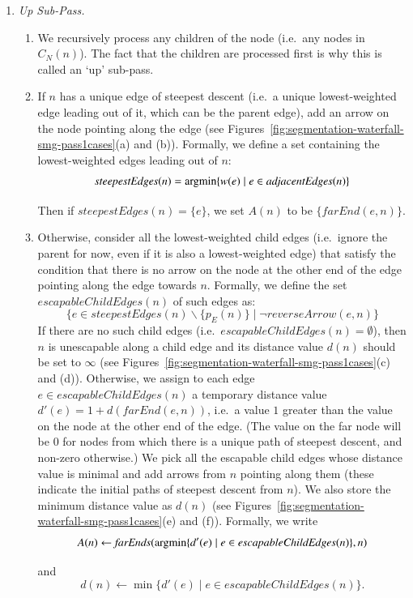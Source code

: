 \documentclass[preprint,a4paper]{elsarticle}
\newcommand{\argmin}{\operatornamewithlimits{argmin}}
\newcommand{\funcname}[1]{\mathit{#1}}
\begin{document}

\begin{enumerate}

\item \emph{Up Sub-Pass.}

\begin{enumerate}
\item We recursively process any children of the node (i.e.~any nodes in $C_N(n)$). The fact that the children are processed first is why this is called an `up' sub-pass.

\item If $n$ has a unique edge of steepest descent (i.e.~a unique lowest-weighted edge leading out of it, which can be the parent edge), add an arrow on the node pointing along the edge (see Figures~\ref{fig:segmentation-waterfall-smg-pass1cases}(a) and (b)). Formally, we define a set containing the lowest-weighted edges leading out of $n$:
%
\[
\funcname{steepestEdges}(n) = \argmin_{}\{w(e) \; | \; e \in \funcname{adjacentEdges}(n)\}
\]
%
Then if $\funcname{steepestEdges}(n) = \{e\}$, we set $A(n)$ to be $\{\funcname{farEnd}(e,n)\}$.

\item Otherwise, consider all the lowest-weighted child edges (i.e.~ignore the parent for now, even if it is also a lowest-weighted edge) that satisfy the condition that there is no arrow on the node at the other end of the edge pointing along the edge towards $n$. Formally, we define the set $\funcname{escapableChildEdges}(n)$ of such edges as:
%
\[
\{e \in \funcname{steepestEdges}(n) \backslash \{p_E(n)\} \; | \; \neg \funcname{reverseArrow}(e,n)\}
\]
%
If there are no such child edges (i.e.~$\funcname{escapableChildEdges}(n) = \emptyset$), then $n$ is unescapable along a child edge and its distance value $d(n)$ should be set to $\infty$ (see Figures~\ref{fig:segmentation-waterfall-smg-pass1cases}(c) and (d)). Otherwise, we assign to each edge $e \in \funcname{escapableChildEdges}(n)$ a temporary distance value $d'(e) = 1 + d(\funcname{farEnd}(e,n))$, i.e.~a value $1$ greater than the value on the node at the other end of the edge. (The value on the far node will be $0$ for nodes from which there is a unique path of steepest descent, and non-zero otherwise.) We pick all the escapable child edges whose distance value is minimal and add arrows from $n$ pointing along them (these indicate the initial paths of steepest descent from $n$). We also store the minimum distance value as $d(n)$ (see Figures~\ref{fig:segmentation-waterfall-smg-pass1cases}(e) and (f)). Formally, we write
%
\[
A(n) \leftarrow \funcname{farEnds}(\argmin_{}\{d'(e) \; | \; e \in \funcname{escapableChildEdges}(n)\}, n)
\]
%
and
\[
d(n) \leftarrow \min_{}\{d'(e) \; | \; e \in \funcname{escapableChildEdges}(n)\}.
\]


\end{enumerate}
\end{enumerate}
\end{document}

